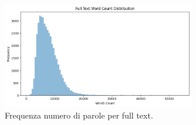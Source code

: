 \documentclass[12pt,a4paper,twoside,openright]{book}
\begin{document}
\begin{figure}
    \centering
    \includegraphics[width=0.75\textwidth]{images/full_text_wc_distrib.png}
    \caption{Frequenza numero di parole per full text.}
    \label{fig:hist_full_word}
\end{figure}
\end{document}
